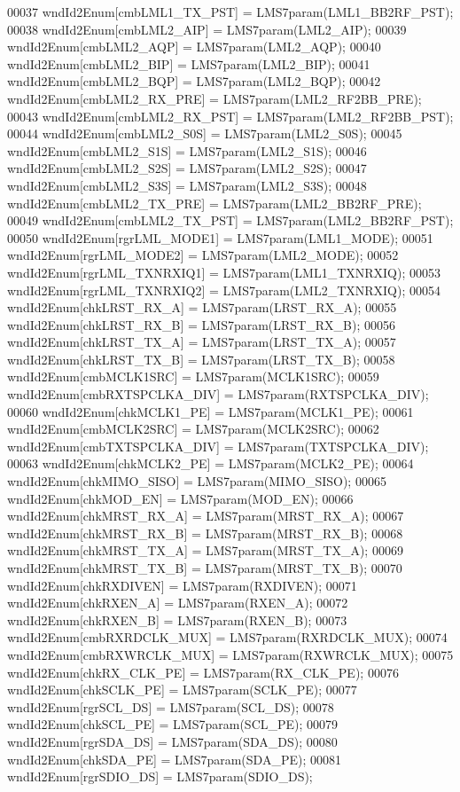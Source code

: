 \begin{DoxyCode}
00037     wndId2Enum[cmbLML1_TX_PST] = LMS7param(LML1_BB2RF_PST);
00038     wndId2Enum[cmbLML2_AIP] = LMS7param(LML2_AIP);
00039     wndId2Enum[cmbLML2_AQP] = LMS7param(LML2_AQP);
00040     wndId2Enum[cmbLML2_BIP] = LMS7param(LML2_BIP);
00041     wndId2Enum[cmbLML2_BQP] = LMS7param(LML2_BQP);
00042     wndId2Enum[cmbLML2_RX_PRE] = LMS7param(LML2_RF2BB_PRE);
00043     wndId2Enum[cmbLML2_RX_PST] = LMS7param(LML2_RF2BB_PST);
00044     wndId2Enum[cmbLML2_S0S] = LMS7param(LML2_S0S);
00045     wndId2Enum[cmbLML2_S1S] = LMS7param(LML2_S1S);
00046     wndId2Enum[cmbLML2_S2S] = LMS7param(LML2_S2S);
00047     wndId2Enum[cmbLML2_S3S] = LMS7param(LML2_S3S);
00048     wndId2Enum[cmbLML2_TX_PRE] = LMS7param(LML2_BB2RF_PRE);
00049     wndId2Enum[cmbLML2_TX_PST] = LMS7param(LML2_BB2RF_PST);
00050     wndId2Enum[rgrLML_MODE1] = LMS7param(LML1_MODE);
00051     wndId2Enum[rgrLML_MODE2] = LMS7param(LML2_MODE);
00052     wndId2Enum[rgrLML_TXNRXIQ1] = LMS7param(LML1_TXNRXIQ);
00053     wndId2Enum[rgrLML_TXNRXIQ2] = LMS7param(LML2_TXNRXIQ);
00054     wndId2Enum[chkLRST_RX_A] = LMS7param(LRST_RX_A);
00055     wndId2Enum[chkLRST_RX_B] = LMS7param(LRST_RX_B);
00056     wndId2Enum[chkLRST_TX_A] = LMS7param(LRST_TX_A);
00057     wndId2Enum[chkLRST_TX_B] = LMS7param(LRST\_TX\_B);
00058     wndId2Enum[cmbMCLK1SRC] = LMS7param(MCLK1SRC);
00059     wndId2Enum[cmbRXTSPCLKA_DIV] = LMS7param(RXTSPCLKA_DIV);
00060     wndId2Enum[chkMCLK1_PE] = LMS7param(MCLK1_PE);
00061     wndId2Enum[cmbMCLK2SRC] = LMS7param(MCLK2SRC);
00062     wndId2Enum[cmbTXTSPCLKA_DIV] = LMS7param(TXTSPCLKA_DIV);
00063     wndId2Enum[chkMCLK2_PE] = LMS7param(MCLK2_PE);
00064     wndId2Enum[chkMIMO_SISO] = LMS7param(MIMO_SISO);
00065     wndId2Enum[chkMOD_EN] = LMS7param(MOD_EN);
00066     wndId2Enum[chkMRST_RX_A] = LMS7param(MRST_RX_A);
00067     wndId2Enum[chkMRST_RX_B] = LMS7param(MRST_RX_B);
00068     wndId2Enum[chkMRST_TX_A] = LMS7param(MRST_TX_A);
00069     wndId2Enum[chkMRST_TX_B] = LMS7param(MRST_TX_B);
00070     wndId2Enum[chkRXDIVEN] = LMS7param(RXDIVEN);
00071     wndId2Enum[chkRXEN_A] = LMS7param(RXEN_A);
00072     wndId2Enum[chkRXEN_B] = LMS7param(RXEN_B);
00073     wndId2Enum[cmbRXRDCLK_MUX] = LMS7param(RXRDCLK_MUX);
00074     wndId2Enum[cmbRXWRCLK_MUX] = LMS7param(RXWRCLK_MUX);
00075     wndId2Enum[chkRX_CLK_PE] = LMS7param(RX_CLK_PE);
00076     wndId2Enum[chkSCLK_PE] = LMS7param(SCLK_PE);
00077     wndId2Enum[rgrSCL_DS] = LMS7param(SCL_DS);
00078     wndId2Enum[chkSCL_PE] = LMS7param(SCL_PE);
00079     wndId2Enum[rgrSDA_DS] = LMS7param(SDA_DS);
00080     wndId2Enum[chkSDA_PE] = LMS7param(SDA_PE);
00081     wndId2Enum[rgrSDIO_DS] = LMS7param(SDIO_DS);

\end{DoxyCode}
